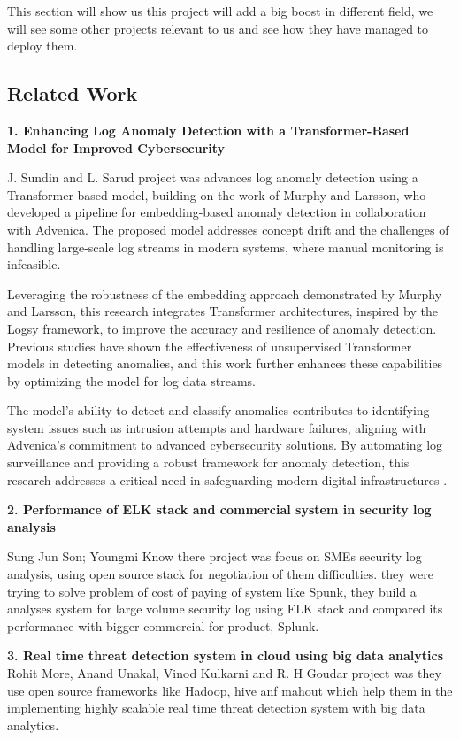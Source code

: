 This section will show us this project will add a big boost in different field, we will see some other projects relevant to us and see how they have managed to deploy them.

\subsection{Related Work}

\textbf{1. Enhancing Log Anomaly Detection with a Transformer-Based Model for Improved Cybersecurity}

J. Sundin and L. Sarud project was advances log anomaly detection using a Transformer-based model, building on the work of Murphy and Larsson, who developed a pipeline for embedding-based anomaly detection in collaboration with Advenica. The proposed model addresses concept drift and the challenges of handling large-scale log streams in modern systems, where manual monitoring is infeasible.

Leveraging the robustness of the embedding approach demonstrated by Murphy and Larsson, this research integrates Transformer architectures, inspired by the Logsy framework, to improve the accuracy and resilience of anomaly detection. Previous studies have shown the effectiveness of unsupervised Transformer models in detecting anomalies, and this work further enhances these capabilities by optimizing the model for log data streams.

The model’s ability to detect and classify anomalies contributes to identifying system issues such as intrusion attempts and hardware failures, aligning with Advenica’s commitment to advanced cybersecurity solutions. By automating log surveillance and providing a robust framework for anomaly detection, this research addresses a critical need in safeguarding modern digital infrastructures \cite{sundin2024ai}.

\textbf{2. Performance of ELK stack and commercial system in security log analysis}

Sung Jun Son; Youngmi Know there project was focus on SMEs security log analysis, using open source stack for negotiation of them difficulties. they were trying to solve problem of cost of paying of system like Spunk, they build a analyses system for large volume security log using ELK stack and compared its performance with bigger commercial for product, Splunk\cite{8311756}. 

\textbf{3. Real time threat detection system in cloud using big data analytics}
Rohit More, Anand Unakal, Vinod Kulkarni and R. H Goudar project was they use open source frameworks like Hadoop, hive anf mahout which help them in the implementing highly scalable real time threat detection system with big data analytics\cite{8663848}.

